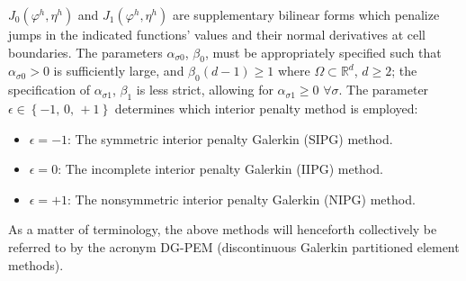 	$J_0 (\varphi^h,\eta^h)$ and $J_1 (\varphi^h,\eta^h)$ are supplementary bilinear forms which penalize jumps in the indicated functions' values and their normal derivatives at cell boundaries. The parameters $\alpha_{\sigma0}$, $\beta_0$, must be appropriately specified such that $\alpha_{\sigma0} > 0$ is sufficiently large, and $\beta_0 (d-1) \geq 1$ where $\Omega \subset \mathbb{R}^d$, $d \geq 2$; the specification of $\alpha_{\sigma1}$, $\beta_1$ is less strict, allowing for $\alpha_{\sigma1} \geq 0 \, \, \forall \sigma$. The parameter $\epsilon \in \left\{ -1, \, 0, \, +1 \right\}$ determines which interior penalty method is employed:
	\begin{itemize}
		\item[] $\epsilon = -1$: The symmetric interior penalty Galerkin (SIPG) method.
		\item[] $\epsilon = 0$: The incomplete interior penalty Galerkin (IIPG) method.
		\item[] $\epsilon = +1$: The nonsymmetric interior penalty Galerkin (NIPG) method.
	\end{itemize}
	As a matter of terminology, the above methods will henceforth collectively be referred to by the acronym DG-PEM (discontinuous Galerkin partitioned element methods).
	
